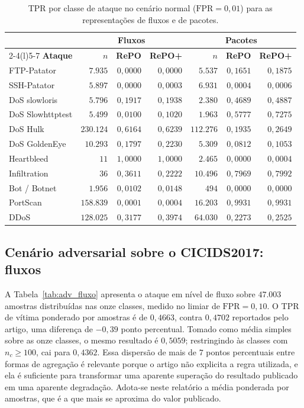 \documentclass[conference]{IEEEtran}
\begin{document}
\begin{table}[!t]
\centering
\footnotesize
\setlength{\tabcolsep}{6pt}
\caption{TPR por classe de ataque no cenário normal ($\text{FPR} = 0{,}01$) para as representações de fluxos e de pacotes.}
\label{tab:normal_por_ataque}
\begin{tabular}{@{}lrrrrrr@{}}
\toprule
& \multicolumn{3}{c}{\textbf{Fluxos}} & \multicolumn{3}{c}{\textbf{Pacotes}} \\
\cmidrule(lr){2-4}\cmidrule(l){5-7}
\textbf{Ataque} & \textbf{$n$} & \textbf{RePO} & \textbf{RePO+} & \textbf{$n$} & \textbf{RePO} & \textbf{RePO+} \\
\midrule
FTP-Patator & $7.935$ & $0{,}0000$ & $0{,}0000$ & $5.537$ & $0{,}1651$ & $0{,}1875$ \\
SSH-Patator & $5.897$ & $0{,}0000$ & $0{,}0003$ & $6.931$ & $0{,}0004$ & $0{,}0006$ \\
DoS slowloris & $5.796$ & $0{,}1917$ & $0{,}1938$ & $2.380$ & $0{,}4689$ & $0{,}4887$ \\
DoS Slowhttptest & $5.499$ & $0{,}0100$ & $0{,}1020$ & $1.963$ & $0{,}5777$ & $0{,}7275$ \\
DoS Hulk & $230.124$ & $0{,}6164$ & $0{,}6239$ & $112.276$ & $0{,}1935$ & $0{,}2649$ \\
DoS GoldenEye & $10.293$ & $0{,}1797$ & $0{,}2230$ & $5.309$ & $0{,}0812$ & $0{,}1053$ \\
Heartbleed & $11$ & $1{,}0000$ & $1{,}0000$ & $2.465$ & $0{,}0000$ & $0{,}0004$ \\
Infiltration & $36$ & $0{,}3611$ & $0{,}2222$ & $10.496$ & $0{,}7969$ & $0{,}7992$ \\
Bot / Botnet & $1.956$ & $0{,}0102$ & $0{,}0148$ & $494$ & $0{,}0000$ & $0{,}0000$ \\
PortScan & $158.839$ & $0{,}0001$ & $0{,}0004$ & $16.203$ & $0{,}9931$ & $0{,}9931$ \\
DDoS & $128.025$ & $0{,}3177$ & $0{,}3974$ & $64.030$ & $0{,}2273$ & $0{,}2525$ \\
\bottomrule
\end{tabular}
\end{table}

\subsection{Cenário adversarial sobre o CICIDS2017: fluxos}

A Tabela~\ref{tab:adv_fluxo} apresenta o ataque em nível de fluxo sobre $47.003$ amostras distribuídas nas onze classes, medido no limiar de $\text{FPR} = 0{,}10$.
O TPR de vítima ponderado por amostras é de $0{,}4663$, contra $0{,}4702$ reportados pelo artigo, uma diferença de $-0{,}39$ ponto percentual.
Tomado como média simples sobre as onze classes, o mesmo resultado é $0{,}5059$; restringindo às classes com $n_c \ge 100$, cai para $0{,}4362$.
Essa dispersão de mais de $7$ pontos percentuais entre formas de agregação é relevante porque o artigo não explicita a regra utilizada, e ela é suficiente para transformar uma aparente superação do resultado publicado em uma aparente degradação.
Adota-se neste relatório a média ponderada por amostras, que é a que mais se aproxima do valor publicado.
\end{document}
